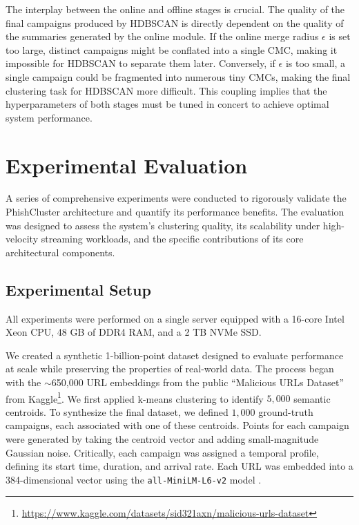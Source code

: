\documentclass[journal,article,submit,pdftex,moreauthors]{Definitions/mdpi}
\begin{document}
The interplay between the online and offline stages is crucial. The quality of the final campaigns produced by HDBSCAN is directly dependent on the quality of the summaries generated by the online module. If the online merge radius $\epsilon$ is set too large, distinct campaigns might be conflated into a single CMC, making it impossible for HDBSCAN to separate them later. Conversely, if $\epsilon$ is too small, a single campaign could be fragmented into numerous tiny CMCs, making the final clustering task for HDBSCAN more difficult. This coupling implies that the hyperparameters of both stages must be tuned in concert to achieve optimal system performance.

\section{Experimental Evaluation}

A series of comprehensive experiments were conducted to rigorously validate the PhishCluster architecture and quantify its performance benefits. The evaluation was designed to assess the system's clustering quality, its scalability under high-velocity streaming workloads, and the specific contributions of its core architectural components.

\subsection{Experimental Setup}

All experiments were performed on a single server equipped with a 16-core Intel Xeon CPU, 48 GB of DDR4 RAM, and a 2 TB NVMe SSD.

We created a synthetic 1-billion-point dataset designed to evaluate performance at scale while preserving the properties of real-world data. The process began with the $\sim$650,000 URL embeddings from the public ``Malicious URLs Dataset'' from Kaggle\footnote{\url{https://www.kaggle.com/datasets/sid321axn/malicious-urls-dataset}}. We first applied k-means clustering to identify $5,000$ semantic centroids. To synthesize the final dataset, we defined $1,000$ ground-truth campaigns, each associated with one of these centroids. Points for each campaign were generated by taking the centroid vector and adding small-magnitude Gaussian noise. Critically, each campaign was assigned a temporal profile, defining its start time, duration, and arrival rate. Each URL was embedded into a 384-dimensional vector using the \texttt{all-MiniLM-L6-v2} model \cite{ref_wang_minilm}.
\end{document}

